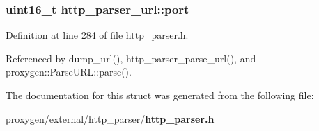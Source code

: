 \subsubsection[{port}]{\setlength{\rightskip}{0pt plus 5cm}uint16\+\_\+t http\+\_\+parser\+\_\+url\+::port}\label{structhttp__parser__url_a875fb8faf3ee45707078eda5435fa563}


Definition at line 284 of file http\+\_\+parser.\+h.



Referenced by dump\+\_\+url(), http\+\_\+parser\+\_\+parse\+\_\+url(), and proxygen\+::\+Parse\+U\+R\+L\+::parse().



The documentation for this struct was generated from the following file\+:\begin{DoxyCompactItemize}
\item 
proxygen/external/http\+\_\+parser/{\bf http\+\_\+parser.\+h}\end{DoxyCompactItemize}

